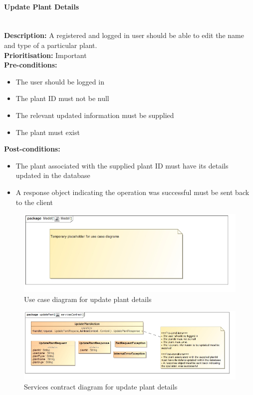 \documentclass{article}
\begin{document}
	\paragraph{Update Plant Details}\mbox{}\\
		\textbf{Description:} A registered and logged in user should be able to edit the name and type of a particular plant.\\
		\textbf{Prioritisation:} Important\\		
		\textbf{Pre-conditions:}
			\begin{itemize}
				\item The user should be logged in
				\item The plant ID must not be null
				\item The relevant updated information must be supplied
				\item The plant must exist
			\end{itemize}
		\textbf{Post-conditions:}
			\begin{itemize}
				\item The plant associated with the supplied plant ID must have its details updated in the database
				\item A response object indicating the operation was successful must be sent back to the client
			\end{itemize}

		\begin{figure}[H]
			\includegraphics[width=\linewidth]{images/tempUseCase.jpg}
			\caption{Use case diagram for update plant details}
		\end{figure}
		
		\begin{figure}[H]
			\includegraphics[width=\linewidth]{images/ServicesContracts/updatePlant.jpg}
			\caption{Services contract diagram for update plant details}
		\end{figure}		
		
\end{document}
